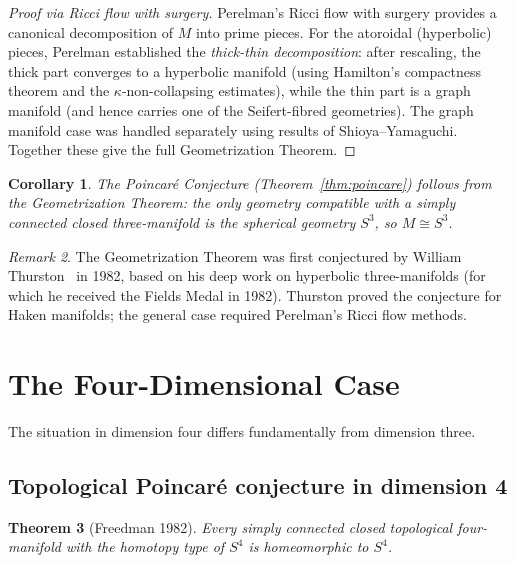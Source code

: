 \documentclass[12pt,a4paper]{amsart}
\newtheorem{theorem}{Theorem}[section]
\newtheorem{corollary}[theorem]{Corollary}
\theoremstyle{definition}
\theoremstyle{remark}
\newtheorem{remark}[theorem]{Remark}
\begin{document}
\begin{proof}[Proof via Ricci flow with surgery]
Perelman's Ricci flow with surgery provides a canonical decomposition of $M$
into prime pieces.  For the atoroidal (hyperbolic) pieces, Perelman established
the \emph{thick-thin decomposition}: after rescaling, the thick part converges
to a hyperbolic manifold (using Hamilton's compactness theorem and the
$\kappa$-non-collapsing estimates), while the thin part is a graph manifold
(and hence carries one of the Seifert-fibred geometries).  The graph manifold
case was handled separately using results of Shioya--Yamaguchi.  Together
these give the full Geometrization Theorem.
\end{proof}

\begin{corollary}
The Poincar\'{e} Conjecture (Theorem~\ref{thm:poincare}) follows from the
Geometrization Theorem: the only geometry compatible with a simply connected
closed three-manifold is the spherical geometry $S^3$, so $M \cong S^3$.
\end{corollary}

\begin{remark}
The Geometrization Theorem was first conjectured by William Thurston~\cite{Thurston1982}
in 1982, based on his deep work on hyperbolic three-manifolds (for which he
received the Fields Medal in 1982).  Thurston proved the conjecture for
Haken manifolds; the general case required Perelman's Ricci flow methods.
\end{remark}


\section{The Four-Dimensional Case}
\label{sec:4d}

The situation in dimension four differs fundamentally from dimension three.

\subsection{Topological Poincar\'{e} conjecture in dimension 4}

\begin{theorem}[Freedman 1982]
\label{thm:freedman}
Every simply connected closed topological four-manifold with the homotopy
type of $S^4$ is homeomorphic to $S^4$.
\end{theorem}
\end{document}
